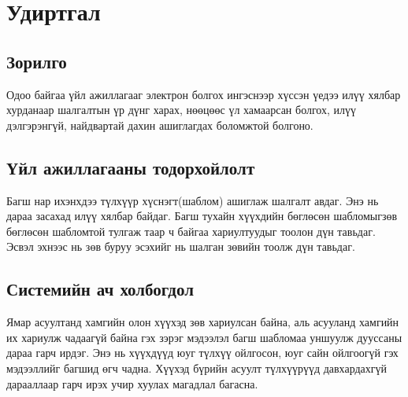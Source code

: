 
\section{Удиртгал}

    \subsection{Зорилго}
		Одоо байгаа үйл ажиллагааг электрон болгох ингэснээр хүссэн үедээ илүү хялбар хурданаар шалгалтын үр дүнг харах, нөөцөөс үл хамаарсан болгох, илүү дэлгэрэнгүй, найдвартай дахин ашиглагдах боломжтой болгоно.
    \subsection{Үйл ажиллагааны тодорхойлолт}
		Багш нар ихэнхдээ түлхүүр хүснэгт(шаблом) ашиглаж шалгалт авдаг. Энэ нь дараа засахад илүү хялбар байдаг. Багш тухайн хүүхдийн бөглөсөн шабломыгзөв бөглөсөн шабломтой тулгаж таар ч байгаа хариултуудыг тоолон дүн тавьдаг. Эсвэл эхнээс нь зөв буруу эсэхийг нь шалган зөвийн тоолж дүн тавьдаг.
    \subsection{Системийн ач холбогдол}
		Ямар асуултанд хамгийн олон хүүхэд зөв хариулсан байна, аль асууланд хамгийн их хариулж чадаагүй байна гэх зэрэг мэдээлэл багш шабломаа уншуулж дууссаны дараа гарч ирдэг. Энэ нь хүүхдүүд юуг түлхүү ойлгосон, юуг сайн ойлгоогүй гэх мэдээллийг багшид өгч чадна. Хүүхэд бүрийн асуулт түлхүүрүүд давхардахгүй дарааллаар гарч ирэх учир хуулах магадлал багасна.
